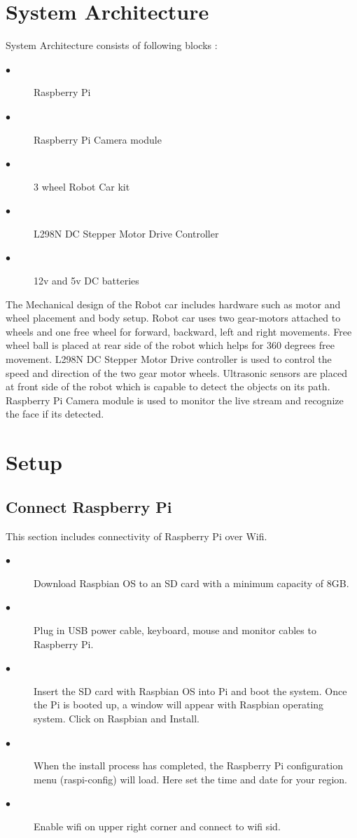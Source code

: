 \documentclass[sigconf]{acmart}
\begin{document}
\section{System Architecture}
System Architecture consists of following blocks :
\begin{description}
    \item[$\bullet$] Raspberry Pi

    \item[$\bullet$] Raspberry Pi Camera module 

    \item[$\bullet$] 3 wheel Robot Car kit

    \item[$\bullet$] L298N DC Stepper Motor Drive Controller 

    \item[$\bullet$] 12v and 5v DC batteries
    
\end{description}

The Mechanical design of the Robot car includes hardware such as motor and wheel placement and body setup. Robot car uses two gear-motors attached to wheels and one free wheel for forward, backward, left and right movements. Free wheel ball is placed at rear side of the robot which helps for 360 degrees free movement. L298N DC Stepper Motor Drive controller is used to control the speed and direction of the two gear motor wheels. Ultrasonic sensors are placed at front side of the robot which is capable to detect the objects on its path. Raspberry Pi Camera module is used to monitor the live stream and recognize the face if its detected.

\section{Setup}
\subsection{Connect Raspberry Pi}
This section includes connectivity of Raspberry Pi over Wifi. 
\begin{description}

    \item[$\bullet$] Download Raspbian OS to an SD card with a minimum capacity of 8GB.
    
    \item[$\bullet$] Plug in USB power cable, keyboard, mouse and monitor cables to Raspberry Pi.
    
    \item[$\bullet$] Insert the SD card with Raspbian OS into Pi and boot the system. Once the Pi is booted up, a window will appear with Raspbian operating system. Click on Raspbian and Install.
    
    \item[$\bullet$] When the install process has completed, the Raspberry Pi configuration menu (raspi-config) will load. Here  set the time and date for your region.
    
    \item[$\bullet$] Enable wifi on upper right corner and connect to wifi sid.
\end{description}
\end{document}
